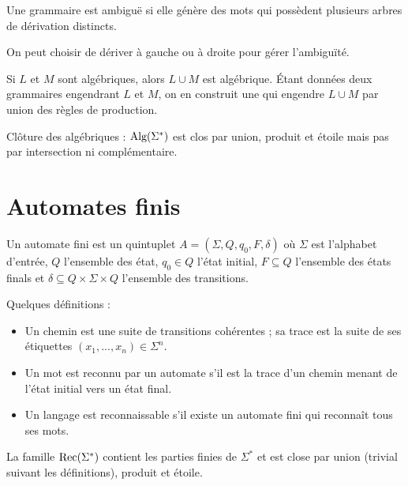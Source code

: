 \documentclass[a4paper]{article}
\begin{document}
\begin{defi}
Une grammaire est ambiguë si elle génère des mots qui possèdent plusieurs arbres de dérivation distincts.
\end{defi}

On peut choisir de dériver à gauche ou à droite pour gérer l'ambiguïté.

\begin{prop}
Si $L$ et $M$ sont algébriques, alors $L\cup M$ est algébrique. \'Etant données deux grammaires engendrant $L$ et $M$, on en construit une qui engendre $L\cup M$ par union des règles de production.
\end{prop}

Clôture des algébriques : $\textnormal{Alg}(\Sigma^*)$ est clos par union, produit et étoile mais pas par intersection ni complémentaire.


\section{Automates finis}

\begin{defi}
Un automate fini est un quintuplet $A=(\Sigma,Q,q_0,F,\delta)$ où $\Sigma$ est l'alphabet d'entrée, $Q$ l'ensemble des état, $q_0\in Q$ l'état initial, $F\subseteq Q$ l'ensemble des états finals et $\delta\subseteq Q\times\Sigma\times Q$ l'ensemble des transitions.
\end{defi}

\begin{defi} Quelques définitions :\begin{itemize}
  \item Un chemin est une suite de transitions cohérentes ; sa trace est la suite de ses étiquettes $(x_1,...,x_n)\in \Sigma^n$.
  \item Un mot est reconnu par un automate s'il est la trace d'un chemin menant de l'état initial vers un état final.
  \item Un langage est reconnaissable s'il existe un automate fini qui reconnaît tous ses mots.
\end{itemize}\end{defi}

\begin{prop}
La famille $\textnormal{Rec}(\Sigma^*)$ contient les parties finies de $\Sigma^*$ et est close par union (trivial suivant les définitions), produit et étoile.
\end{prop}
\end{document}
